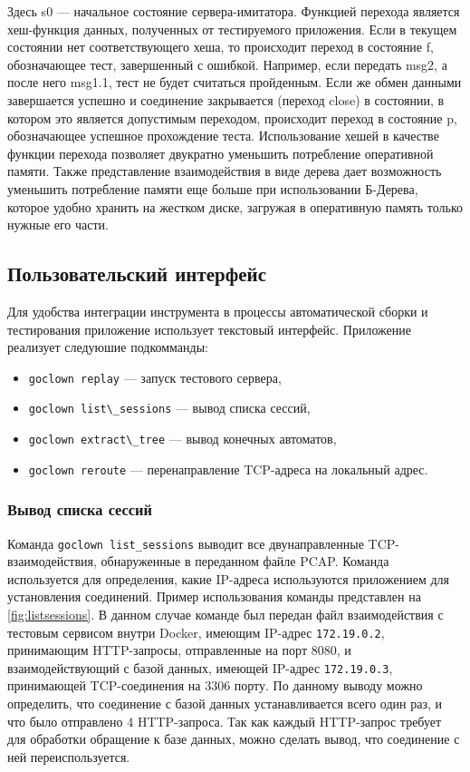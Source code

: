 Здесь s0 --- начальное состояние сервера-имитатора. Функцией перехода является
хеш-функция данных, полученных от тестируемого приложения. Если в текущем
состоянии нет соответствующего хеша, то происходит переход в состояние f,
обозначающее тест, завершенный с ошибкой. Например, если передать msg2, а после
него msg1.1, тест не будет считаться пройденным. Если же обмен данными
завершается успешно и соединение закрывается (переход close) в состоянии, в
котором это является допустимым переходом, происходит переход в состояние p,
обозначающее успешное прохождение теста.
Использование хешей в качестве функции перехода позволяет двукратно уменьшить
потребление оперативной памяти. Также представление взаимодействия в виде
дерева дает возможность уменьшить потребление памяти еще больше при
использовании Б-Дерева, которое удобно хранить на жестком диске, загружая
в оперативную память только нужные его части.

\subsection{Пользовательский интерфейс}
Для удобства интеграции инструмента в процессы автоматической сборки и
тестирования приложение использует текстовый интерфейс.
Приложение реализует следуюшие подкомманды:

\begin{itemize}
    \item \lstinline{goclown replay} --- запуск тестового сервера,  
    \item \lstinline{goclown list\_sessions} --- вывод списка сессий,  
    \item \lstinline{goclown extract\_tree} --- вывод конечных автоматов,  
    \item \lstinline{goclown reroute} --- перенаправление TCP-адреса на
        локальный адрес.  
\end{itemize}

\subsubsection{Вывод списка сессий}
Команда \lstinline{goclown list_sessions} выводит все двунаправленные
TCP-взаимодействия, обнаруженные в переданном файле PCAP. Команда используется
для определения, какие IP-адреса используются приложением для установления
соединений. Пример использования команды представлен на
\autoref{fig:listsessions}. В данном случае команде был передан файл
взаимодействия с тестовым сервисом внутри Docker, имеющим IP-адрес
\lstinline{172.19.0.2}, принимающим HTTP-запросы, отправленные на порт 8080, и
взаимодействующий с базой данных, имеющей IP-адрес \lstinline{172.19.0.3},
принимающей TCP-соединения на 3306 порту. По данному выводу можно определить,
что соединение с базой данных устанавливается всего один раз, и что было
отправлено 4 HTTP-запроса. Так как каждый HTTP-запрос требует для обработки
обращение к базе данных, можно сделать вывод, что соединение с ней
переиспользуется.

